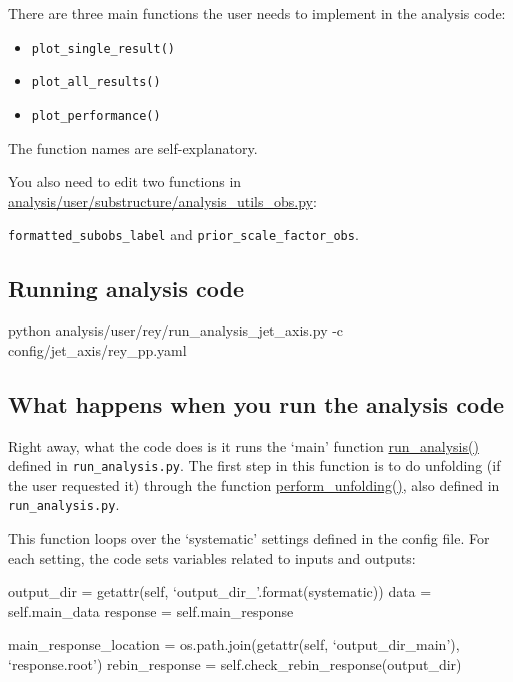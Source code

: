 \documentclass[12pt]{article}
\begin{document}
There are three main functions the user needs to implement in the analysis code:

\begin{itemize}
\item \verb|plot_single_result()|
\item \verb|plot_all_results()|
\item \verb|plot_performance()|
\end{itemize}

The function names are self-explanatory.

You also need to edit two functions in \href{https://github.com/reynier0611/pyjetty/blob/master/pyjetty/alice_analysis/analysis/user/substructure/analysis_utils_obs.py}{analysis/user/substructure/analysis\_utils\_obs.py}:

\verb|formatted_subobs_label| and \verb|prior_scale_factor_obs|.

\subsection{Running analysis code}

\begin{tcolorbox}
\begin{verbnobox}[\scriptsize]
python analysis/user/rey/run_analysis_jet_axis.py  -c config/jet_axis/rey_pp.yaml
\end{verbnobox}  
\end{tcolorbox}

\subsection{What happens when you run the analysis code}

Right away, what the code does is it runs the `main' function \href{https://github.com/reynier0611/pyjetty/blob/master/pyjetty/alice_analysis/analysis/user/substructure/run_analysis.py#L223}{run\_analysis()} defined in \verb|run_analysis.py|.
The first step in this function is to do unfolding (if the user requested it) through the function \href{https://github.com/reynier0611/pyjetty/blob/master/pyjetty/alice_analysis/analysis/user/substructure/run_analysis.py#L257}{perform\_unfolding()},
also defined in \verb|run_analysis.py|.

This function loops over the `systematic' settings defined in the config file. For each setting, the code sets variables related to inputs and outputs:

\begin{tcolorbox}
\begin{verbnobox}[\scriptsize]
output_dir = getattr(self, `output_dir_{}'.format(systematic))
data = self.main_data
response = self.main_response

main_response_location = os.path.join(getattr(self, `output_dir_main'), `response.root')
rebin_response = self.check_rebin_response(output_dir)
\end{verbnobox}  
\end{tcolorbox}
\end{document}
